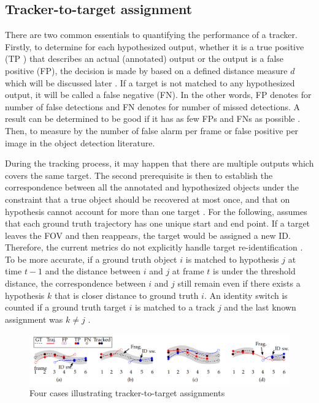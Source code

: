 \subsection{Tracker-to-target assignment}
\hspace{0.45cm}There are two common essentials to quantifying the performance of a tracker. 
Firstly, to determine for each hypothesized output, whether it is a true positive (\acrshort{TP}
) that describes an actual (annotated) output or the output is a false positive (\acrshort{FP}),
 the decision is made by based on a defined distance measure $d$ which will be discussed later \cite{Milan2016MOT16AB}.
  If a target is not matched to any hypothesized output, it will be called a false negative (\acrshort{FN}). 
  In the other words, \acrshort{FP} denotes for number of false detections and \acrshort{FN} denotes for number of missed detections\cite{sort}. A result can be determined to be good if it has as few FPs and FNs as possible \cite{Milan2016MOT16AB}. 
  Then, to measure by the number of false alarm per frame or false positive per image in the object detection literature.\par
During the tracking process, it may happen that there are multiple outputs which covers the same target. 
The second prerequisite is then to establish the correspondence between all the annotated and hypothesized 
objects under the constraint that a true object should be recovered at most once, 
and that on hypothesis cannot account for more than one target \cite{Milan2016MOT16AB}. 
For the following, \cite{Milan2016MOT16AB} assumes that each ground truth trajectory has one unique start and end point. 
If a target leaves the \acrshort{FOV} and then reappears, the target would be assigned a new \acrshort{ID}. 
Therefore, the current metrics do not explicitly handle target re-identification \cite{Milan2016MOT16AB}. 
To be more accurate, if a ground truth object $i$ is matched to hypothesis $j$ at time $t-1$ and the distance between $i$ and $j$ at 
frame $t$ is under the threshold distance, the correspondence between $i$ and $j$ still 
remain even if there exists a hypothesis $k$ that is closer distance to ground truth $i$. 
An identity switch is counted if a ground truth target $i$ is matched to a track $j$ and the last known assignment was $k\neq j$ \cite{Milan2016MOT16AB}.\par
\begin{figure}[h!]
    \centering
    \includegraphics[width=\textwidth]{Chapters/Fig/id_switch_mot.png}
    \caption{Four cases illustrating tracker-to-target assignments}
    \label{fig:ids_mot}
\end{figure}
